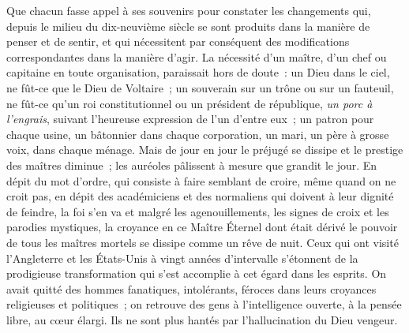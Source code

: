 \documentclass[french,twoside]{book} %
\begin{document}
Que chacun fasse appel à ses souvenirs pour constater les changements qui, depuis le milieu du dix-neuvième siècle se sont produits dans la manière de penser et de sentir, et qui nécessitent par conséquent des modifications correspondantes dans la manière d’agir. La nécessité d’un maître, d’un chef ou  capitaine en toute organisation, paraissait hors de doute : un Dieu dans le ciel, ne fût-ce que le Dieu de Voltaire ; un souverain sur un trône ou sur un fauteuil, ne fût-ce qu’un roi constitutionnel ou un président de république, \emph{un porc à l’engrais}, suivant l’heureuse expression de l’un d’entre eux ; un patron pour chaque usine, un bâtonnier dans chaque corporation, un mari, un père à grosse voix, dans chaque ménage. Mais de jour en jour le préjugé se dissipe et le prestige des maîtres diminue ; les auréoles pâlissent à mesure que grandit le jour. En dépit du mot d’ordre, qui consiste à faire semblant de croire, même quand on ne croit pas, en dépit des académiciens et des normaliens qui doivent à leur dignité de feindre, la foi s’en va et malgré les agenouillements,  les signes de croix et les parodies mystiques, la croyance en ce Maître Éternel dont était dérivé le pouvoir de tous les maîtres mortels se dissipe comme un rêve de nuit. Ceux qui ont visité l’Angleterre et les États-Unis à vingt années d’intervalle s’étonnent de la prodigieuse transformation qui s’est accomplie à cet égard dans les esprits. On avait quitté des hommes fanatiques, intolérants, féroces dans leurs croyances religieuses et politiques ; on retrouve des gens à l’intelligence ouverte, à la pensée libre, au cœur élargi. Ils ne sont plus hantés par l’hallucination du Dieu vengeur.\par
\end{document}
